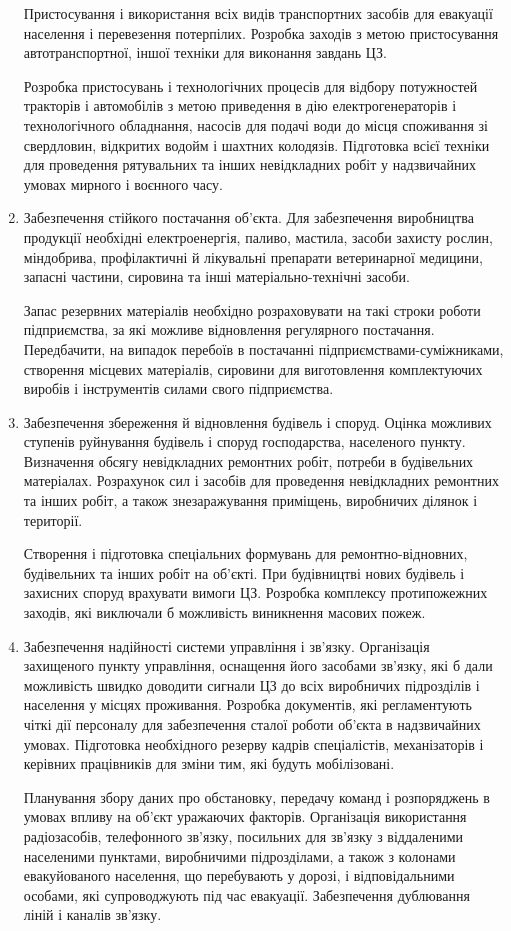 \begin{enumerate}
	      Пристосування і використання всіх видів транспортних засобів для евакуації населення і перевезення потерпілих. Розробка заходів з метою пристосування автотранспортної, іншої техніки для виконання завдань ЦЗ.

	      Розробка пристосувань і технологічних процесів для відбору потужностей тракторів і автомобілів з метою приведення в дію електрогенераторів і технологічного обладнання, насосів для подачі води до місця споживання зі свердловин, відкритих водойм і шахтних колодязів. Підготовка всієї техніки для проведення рятувальних та інших невідкладних робіт у надзвичайних умовах мирного і воєнного часу.
	\item Забезпечення стійкого постачання об'єкта. Для забезпечення виробництва продукції необхідні електроенергія, паливо, мастила, засоби захисту рослин, міндобрива, профілактичні й лікувальні препарати ветеринарної медицини, запасні частини, сировина та інші матеріально-технічні засоби.

	      Запас резервних матеріалів необхідно розраховувати на такі строки роботи підприємства, за які можливе відновлення регулярного постачання. Передбачити, на випадок перебоїв в постачанні підприємствами-суміжниками, створення місцевих матеріалів, сировини для виготовлення комплектуючих виробів і інструментів силами свого підприємства.

	\item Забезпечення збереження й відновлення будівель і споруд. Оцінка можливих ступенів руйнування будівель і споруд господарства, населеного пункту. Визначення обсягу невідкладних ремонтних робіт, потреби в будівельних матеріалах. Розрахунок сил і засобів для проведення невідкладних ремонтних та інших робіт, а також знезаражування приміщень, виробничих ділянок і території.

	      Створення і підготовка спеціальних формувань для ремонтно-відновних, будівельних та інших робіт на об'єкті. При будівництві нових будівель і захисних споруд врахувати вимоги ЦЗ. Розробка комплексу протипожежних заходів, які виключали б можливість виникнення масових пожеж.

	\item Забезпечення надійності системи управління і зв'язку. Організація захищеного пункту управління, оснащення його засобами зв'язку, які б дали можливість швидко доводити сигнали ЦЗ до всіх виробничих підрозділів і населення у місцях проживання. Розробка документів, які регламентують чіткі дії персоналу для забезпечення сталої роботи об'єкта в надзвичайних умовах. Підготовка необхідного резерву кадрів спеціалістів, механізаторів і керівних працівників для зміни тим, які будуть мобілізовані.

	      Планування збору даних про обстановку, передачу команд і розпоряджень в умовах впливу на об'єкт уражаючих факторів. Організація використання радіозасобів, телефонного зв'язку, посильних для зв'язку з віддаленими населеними пунктами, виробничими підрозділами, а також з колонами евакуйованого населення, що перебувають у дорозі, і відповідальними особами, які супроводжують під час евакуації. Забезпечення дублювання ліній і каналів зв'язку.
\end{enumerate}

